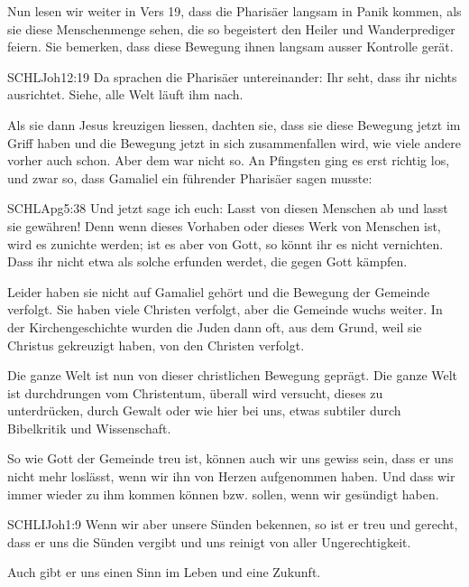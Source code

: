 \documentclass[fontsize=16pt]{mybib}
\begin{document}
    Nun lesen wir weiter in Vers 19, dass die Pharisäer langsam in Panik kommen, als sie diese Menschenmenge sehen, die so begeistert den Heiler und Wanderprediger feiern. Sie bemerken, dass diese Bewegung ihnen langsam ausser Kontrolle gerät. 
    \begin{bibelbox}{SCHL}{Joh}{12:19}
    Da sprachen die Pharisäer untereinander: Ihr seht, dass ihr nichts ausrichtet. Siehe, alle Welt läuft ihm nach.
    \end{bibelbox}
    Als sie dann Jesus kreuzigen liessen, dachten sie, dass sie diese Bewegung jetzt im Griff haben und die Bewegung jetzt in sich zusammenfallen wird, wie viele andere vorher auch schon. Aber dem war nicht so. An Pfingsten ging es erst richtig los, und zwar so, dass Gamaliel ein führender Pharisäer sagen musste:
    \begin{bibelbox}{SCHL}{Apg}{5:38}
    Und jetzt sage ich euch: Lasst von diesen Menschen ab und lasst sie gewähren! Denn wenn dieses Vorhaben oder dieses Werk von Menschen ist, wird es zunichte werden; ist es aber von Gott, so könnt ihr es nicht vernichten. Dass ihr nicht etwa als solche erfunden werdet, die gegen Gott kämpfen.
    \end{bibelbox}
    Leider haben sie nicht auf Gamaliel gehört und die Bewegung der Gemeinde verfolgt. Sie haben viele Christen verfolgt, aber die Gemeinde wuchs weiter. In der Kirchengeschichte wurden die Juden dann oft, aus dem Grund, weil sie Christus gekreuzigt haben, von den Christen verfolgt.

    Die ganze Welt ist nun von dieser christlichen Bewegung geprägt. Die ganze Welt ist durchdrungen vom Christentum, überall wird versucht, dieses zu unterdrücken, durch Gewalt oder wie hier bei uns, etwas subtiler durch Bibelkritik und Wissenschaft. 

    So wie Gott der Gemeinde treu ist, können auch wir uns gewiss sein, dass er uns nicht mehr loslässt, wenn wir ihn von Herzen aufgenommen haben. Und dass wir immer wieder zu ihm kommen können bzw. sollen, wenn wir gesündigt haben. 
    \begin{bibelbox}{SCHL}{IJoh}{1:9}
    Wenn wir aber unsere Sünden bekennen, so ist er treu und gerecht, dass er uns die Sünden vergibt und uns reinigt von aller Ungerechtigkeit.
    \end{bibelbox}
    Auch gibt er uns einen Sinn im Leben und eine Zukunft.
\end{document}
